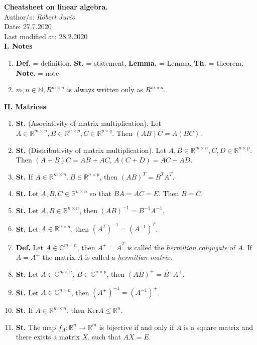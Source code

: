 \documentclass{article}
\newcommand{\<}{\left<}
\renewcommand{\>}{\right>}
\renewcommand{\ker}{\text{Ker}}
\newcommand{\N}{\mathbb{N}}
\newcommand{\R}{\mathbb{R}}
\newcommand{\C}{\mathbb{C}}
\newcommand{\define}{\textbf{Def. }}
\newcommand{\lemma}{\textbf{Lemma. }}
\newcommand{\state}{\textbf{St. }}
\newcommand{\theor}{\textbf{Th. }}
\newcommand{\note}{\textbf{Note. }}
\begin{document}
\begin{multicols}{3}

    \textbf{Cheatsheet on linear algebra.}\\
    \indent Author/s: \emph{R\'obert Jur\v{c}o}\\
    \indent Date: 27.7.2020\\
    \indent Last modified at: 28.2.2020\\

    \textbf{I. Notes}

    \begin{enumerate}[itemsep=2pt, topsep=2pt, partopsep=2pt, parsep=2pt]
        \item \define = definition, \state = statement, \lemma = Lemma, \theor = theorem, \note = note
        \item $m,n\in\N,R^{m\times n}$ is always written only as $R^{m\times n}$.

    \end{enumerate}


    \textbf{II. Matrices}

    \begin{enumerate}[itemsep=2pt, topsep=2pt, partopsep=2pt, parsep=2pt]

        \item \state (Asociativity of matrix multiplication). Let $A\in\R^{m\times n},B\in\R^{n\times p},C\in\R^{p\times q}$. Then $\left(AB\right)C=A\left(BC\right)$.
        \item \state (Distributivity of matrix multiplication). Let $A,B\in\R^{m\times n},C,D\in\R^{n\times p}$. Then $\left(A+B\right)C=AB+AC$, $A\left(C+D\right)=AC+AD$.
        \item \state If $A\in\R^{m\times n},B\in\R^{n\times p}$, then $(AB)^T=B^TA^T$.
        \item \state Let $A,B,C\in\R^{n\times n}$ so that $BA=AC=E$. Then $B=C$.
        \item \state Let $A,B\in\R^{n\times n}$, then $\left(AB\right)^{-1}=B^{-1}A^{-1}$.
        \item \state Let $A\in\R^{n\times n}$, then $\left(A^T\right)^{-1}=\left(A^{-1}\right)^T$.
        \item \define Let $A\in\C^{m\times n}$, then $A^+=\bar{A}^T$ is called the \emph{hermitian conjugate} of $A$. If $A=A^+$ the matrix $A$ is called a \emph{hermitian matrix}.
        \item \state Let $A\in\C^{m\times n}$, $B\in\C^{n\times p}$, then $\left(AB\right)^+=B^+A^+$.
        \item \state Let $A\in\C^{n\times n}$, then $\left(A^+\right)^{-1}=\left(A^{-1}\right)^+$.
        \item \state If $A\in\R^{m\times n}$, then $\ker A\leq\R^n$.
        \item \state The map $f_A:\R^n\to\R^m$ is bijective if and only if $A$ is a square matrix and there exists a matrix $X$, such that $AX=E$.


\end{enumerate}
\end{multicols}
\end{document}
